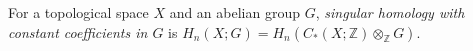 
For a topological space $X$ and an abelian group $G$, \emph{singular homology with constant coefficients in $G$} is $H_n(X;G)=H_n(C_*(X;\mathbb Z)\otimes_{\mathbb Z}G)$.
